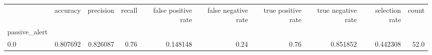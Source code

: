 \begin{tabular}{lrrrrrrrrr}
\toprule
{} &  accuracy &  precision &  recall &  false positive rate &  false negative rate &  true positive rate &  true negative rate &  selection rate &  count \\
passive\_alert &           &            &         &                      &                      &                     &                     &                 &        \\
\midrule
0.0           &  0.807692 &   0.826087 &    0.76 &             0.148148 &                 0.24 &                0.76 &            0.851852 &        0.442308 &   52.0 \\
\bottomrule
\end{tabular}
